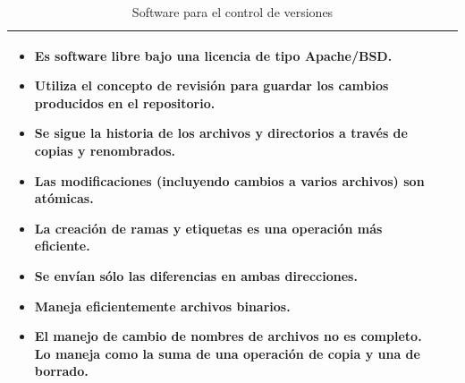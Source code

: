 \begin{table}[b!]
\begin{tabular}{|p{2cm}|ll}
		\multicolumn{1}{p{10cm}|}{
		\begin{itemize}
		\vspace{-35mm}
		\item Es software libre bajo una licencia de tipo Apache/BSD.
		\item Utiliza el concepto de revisión para guardar los cambios producidos en el repositorio.         
		\item  Se sigue la historia de los archivos y directorios a través de copias y renombrados.
		\item Las modificaciones (incluyendo cambios a varios archivos) son atómicas.
		\item La creación de ramas y etiquetas es una operación más eficiente.
		\item Se envían sólo las diferencias en ambas direcciones.
		\item Maneja eficientemente archivos binarios.
		\item El manejo de cambio de nombres de archivos no es completo. Lo maneja como la suma de una operación de copia y una de 	borrado. \cite{39}
		\end{itemize}} \\ 
		\hline
	\end{tabular}
	\caption{Software para el control de versiones}
	\label{table: comparacion control de versiones}
\end{table}

